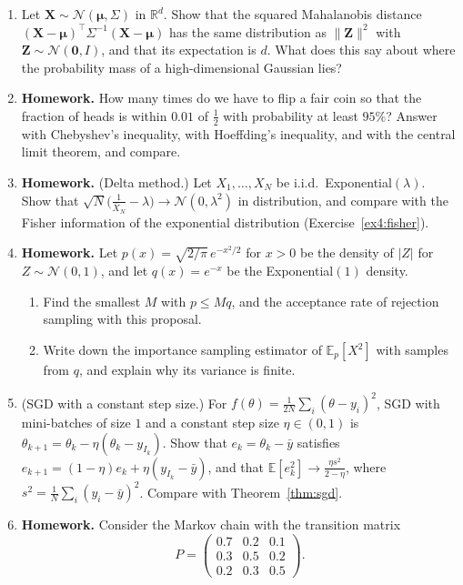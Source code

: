 \documentclass[11pt]{article}
\newcommand{\homework}{\textcolor{red!70!black}{\textbf{Homework.}}}
\newcommand{\norm}[1]{\lVert #1 \rVert}
\newcommand{\E}{\mathbb{E}}
\theoremstyle{definition}
\theoremstyle{plain}
\theoremstyle{remark}
\begin{document}
\begin{enumerate}[leftmargin=*]
    \item Let $\mathbf{X} \sim \mathcal{N}(\boldsymbol{\mu}, \Sigma)$ in $\mathbb{R}^d$. Show that the squared Mahalanobis distance $(\mathbf{X} - \boldsymbol{\mu})^\top\Sigma^{-1}(\mathbf{X} - \boldsymbol{\mu})$ has the same distribution as $\norm{\mathbf{Z}}^2$ with $\mathbf{Z} \sim \mathcal{N}(\mathbf{0}, I)$, and that its expectation is $d$. What does this say about where the probability mass of a high-dimensional Gaussian lies?
    \item \homework{} How many times do we have to flip a fair coin so that the fraction of heads is within $0.01$ of $\frac{1}{2}$ with probability at least $95\%$? Answer with Chebyshev's inequality, with Hoeffding's inequality, and with the central limit theorem, and compare.
    \item \homework{} (Delta method.) Let $X_1, \ldots, X_N$ be i.i.d.\ Exponential$(\lambda)$. Show that $\sqrt{N}\big(\frac{1}{\bar X_N} - \lambda\big) \to \mathcal{N}(0, \lambda^2)$ in distribution, and compare with the Fisher information of the exponential distribution (Exercise~\ref{ex4:fisher}).
    \item \homework{} Let $p(x) = \sqrt{2/\pi}\,e^{-x^2/2}$ for $x > 0$ be the density of $|Z|$ for $Z \sim \mathcal{N}(0, 1)$, and let $q(x) = e^{-x}$ be the Exponential$(1)$ density.
    \begin{enumerate}[label=(\alph*)]
        \item Find the smallest $M$ with $p \leq Mq$, and the acceptance rate of rejection sampling with this proposal.
        \item Write down the importance sampling estimator of $\E_p[X^2]$ with samples from $q$, and explain why its variance is finite.
    \end{enumerate}
    \item (SGD with a constant step size.) For $f(\theta) = \frac{1}{2N}\sum_i (\theta - y_i)^2$, SGD with mini-batches of size $1$ and a constant step size $\eta \in (0, 1)$ is $\theta_{k+1} = \theta_k - \eta(\theta_k - y_{I_k})$. Show that $e_k = \theta_k - \bar y$ satisfies $e_{k+1} = (1 - \eta)e_k + \eta(y_{I_k} - \bar y)$, and that $\E[e_k^2] \to \frac{\eta s^2}{2 - \eta}$, where $s^2 = \frac{1}{N}\sum_i (y_i - \bar y)^2$. Compare with Theorem~\ref{thm:sgd}.
    \item \homework{} Consider the Markov chain with the transition matrix
    \[P = \begin{pmatrix} 0.7 & 0.2 & 0.1 \\ 0.3 & 0.5 & 0.2 \\ 0.2 & 0.3 & 0.5 \end{pmatrix}.\]

\end{enumerate}
\end{document}
